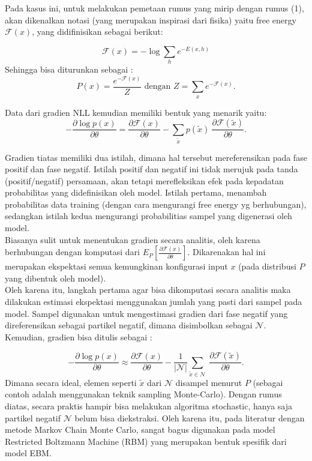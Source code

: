 \documentclass[12pt]{article}
\begin{document}
Pada kasus ini, untuk melakukan pemetaan rumus yang mirip dengan rumus (1), akan dikenalkan notasi (yang merupakan inspirasi dari fisika) yaitu free energy $\mathcal{F}(x)$, yang didifinisikan sebagai berikut:

\begin{equation}
\mathcal{F}(x) = - \log \sum_h e^{-E(x,h)}
\end{equation}
Sehingga bisa diturunkan sebagai :
\[P(x) = \frac{e^{-\mathcal{F}(x)}}{Z} \text{ dengan } Z=\sum_x e^{-\mathcal{F}(x)}.\]

Data dari gradien NLL kemudian memiliki bentuk yang menarik yaitu:
\begin{equation}
- \frac{\partial  \log p(x)}{\partial \theta}
 = \frac{\partial \mathcal{F}(x)}{\partial \theta} -
       \sum_{\tilde{x}} p(\tilde{x}) \
           \frac{\partial \mathcal{F}(\tilde{x})}{\partial \theta}.
\end{equation}

Gradien tiatas memiliki dua istilah, dimana hal tersebut mereferensikan pada fase positif dan fase negatif. Istilah positif dan negatif ini tidak merujuk pada tanda (positif/negatif)  persamaan, akan tetapi merefleksikan efek pada kepadatan probabilitas yang didefinisikan oleh model. Istilah pertama, menambah probabilitas data training (dengan cara mengurangi free energy yg berhubungan), sedangkan istilah kedua mengurangi probabilitias sampel yang digenerasi oleh model.\\

Biasanya sulit untuk menentukan gradien secara analitis, oleh karena berhubungan dengan komputasi dari $E_P [ \frac{\partial \mathcal{F}(x)} {\partial \theta} ]$. Dikarenakan hal ini merupakan ekspektasi semua kemungkinan konfigurasi input $x$ (pada distribusi $P$ yang dibentuk oleh model).\\
Oleh karena itu, langkah pertama agar bisa dikomputasi secara analitis maka dilakukan estimasi ekspektasi menggunakan jumlah yang pasti dari sampel pada model. Sampel digunakan untuk mengestimasi gradien dari fase negatif yang direferensikan sebagai partikel negatif, dimana disimbolkan sebagai $\mathcal{N}$. Kemudian, gradien bisa ditulis sebagai : 

\begin{equation}
- \frac{\partial \log p(x)}{\partial \theta}
 \approx
  \frac{\partial \mathcal{F}(x)}{\partial \theta} -
   \frac{1}{|\mathcal{N}|}\sum_{\tilde{x} \in \mathcal{N}} \
   \frac{\partial \mathcal{F}(\tilde{x})}{\partial \theta}.
\end{equation}
Dimana secara ideal, elemen seperti $\tilde{x}$ dari $\mathcal{N}$ disampel menurut $P$ (sebagai contoh adalah menggunakan teknik sampling Monte-Carlo). Dengan rumus diatas, secara praktis hampir bisa melakukan algoritma stochastic, hanya saja partikel negatif $\mathcal{N}$ belum bisa diekstraksi. Oleh karena itu, pada literatur dengan metode Markov Chain Monte Carlo, sangat bagus digunakan pada model Restricted Boltzmann Machine (RBM) yang merupakan bentuk spesifik dari model EBM.
\end{document}
